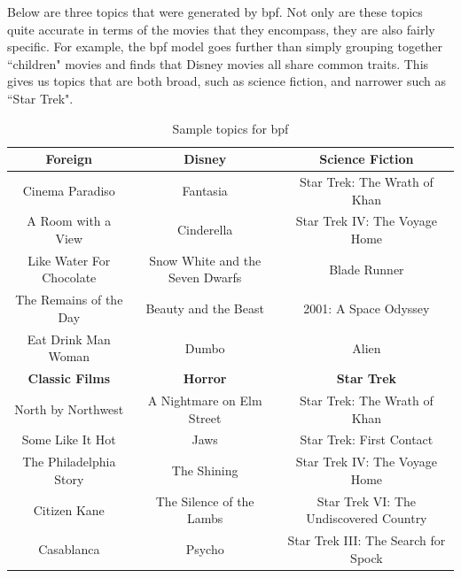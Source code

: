 \documentclass{article} %
\begin{document}
Below are three topics that were generated by \gls{bpf}. Not only are these topics quite accurate in terms of the movies that they encompass, they are also fairly specific. For example, the \gls{bpf} model goes further than simply grouping together ``children" movies and finds that Disney movies all share common traits. This gives us topics that are both broad, such as science fiction, and narrower such as ``Star Trek".
\begin{table}[h]
    \begin{tabularx}{\textwidth}{@{}cc@{}c@{}} \toprule
    \textbf{Foreign}                  & \textbf{Disney}                          & \textbf{Science Fiction}               \\ \midrule
    Cinema Paradiso          & Fantasia                        & Star Trek: The Wrath of Khan  \\
    A Room with a View       & Cinderella                      & Star Trek IV: The Voyage Home \\
    Like Water For Chocolate & Snow White and the Seven Dwarfs & Blade Runner                  \\
    The Remains of the Day   & Beauty and the Beast            & 2001: A Space Odyssey         \\
    Eat Drink Man Woman      & Dumbo                           & Alien                          \vspace{3mm} \\ \toprule

    \textbf{Classic Films}          & \textbf{Horror}                     & \textbf{Star Trek}                              \\ \midrule
     North by Northwest    &  A Nightmare on Elm Street & Star Trek: The Wrath of Khan           \\
    Some Like It Hot       & Jaws                       & Star Trek: First Contact               \\
    The Philadelphia Story & The Shining                & Star Trek IV: The Voyage Home          \\
    Citizen Kane           & The Silence of the Lambs   & Star Trek VI: The Undiscovered Country \\
    Casablanca             & Psycho                     & Star Trek III: The Search for Spock    \\
    \end{tabularx}
    \caption{Sample topics for \gls{bpf}}
\end{table}
\end{document}
